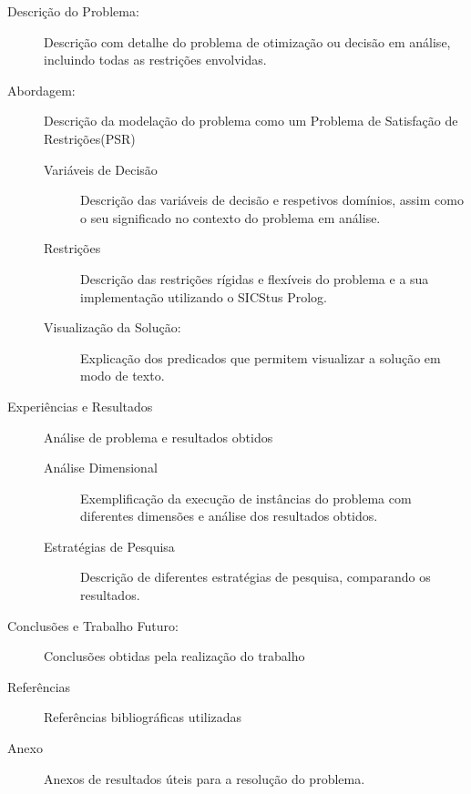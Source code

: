 \documentclass[11pt]{article}
\begin{document}
\begin{description}

\item[Descrição do Problema:] Descrição com detalhe do problema de
otimização ou decisão em análise, incluindo todas as restrições envolvidas.

\item[Abordagem:] Descrição da modelação do problema como um Problema de Satisfação de 
Restrições(PSR)

\begin{description}

\item[Variáveis de Decisão] Descrição das variáveis de decisão e
respetivos domínios, assim como o seu significado no contexto do problema em análise.

\item[Restrições] Descrição das restrições rígidas e flexíveis do problema e a
sua implementação utilizando o SICStus Prolog.

\item[Visualização da Solução:] Explicação dos predicados que permitem
visualizar a solução em modo de texto.

\end{description}


\item[Experiências e Resultados] Análise de problema e resultados obtidos

\begin{description}

\item[Análise Dimensional] Exemplificação da execução de instâncias do problema com
diferentes dimensões e análise dos resultados obtidos.

\item[Estratégias de Pesquisa] Descrição de diferentes estratégias de pesquisa, comparando 
os resultados.

\end{description}


\item[Conclusões e Trabalho Futuro:] Conclusões obtidas pela realização do trabalho

\item[Referências] Referências bibliográficas utilizadas

\item[Anexo] Anexos de resultados úteis para a resolução do problema.

\end{description}
\end{document}
